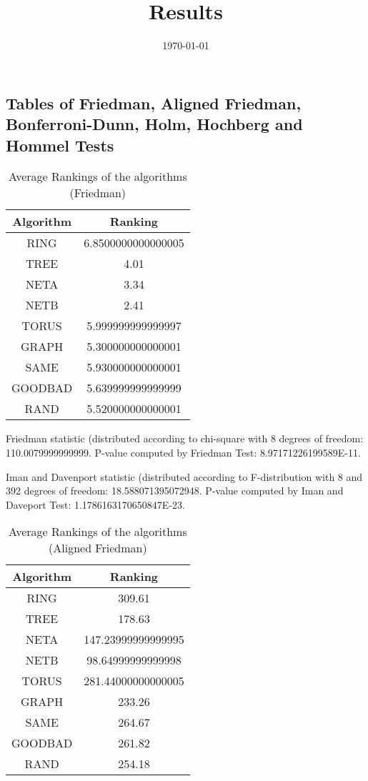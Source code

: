 \documentclass[a4paper,10pt]{article}
\title{Results}
\author{}
\date{\today}
\begin{document}
\begin{landscape}
\oddsidemargin 0in \topmargin 0in\maketitle
\section{Tables of Friedman, Aligned Friedman, Bonferroni-Dunn, Holm, Hochberg and Hommel Tests}
\begin{table}[!htp]
\centering
\caption{Average Rankings of the algorithms (Friedman)
}\begin{tabular}{c|c}
Algorithm&Ranking\\
\hline
 RING&6.8500000000000005\\
 TREE&4.01\\
 NETA&3.34\\
 NETB&2.41\\
 TORUS&5.999999999999997\\
 GRAPH&5.300000000000001\\
 SAME&5.930000000000001\\
 GOODBAD&5.639999999999999\\
 RAND&5.520000000000001\\
\end{tabular}
\end{table}


Friedman statistic (distributed according to chi-square with 8 degrees of freedom: 110.0079999999999. 
P-value computed by Friedman Test: 8.97171226199589E-11.\newline

Iman and Davenport statistic (distributed according to F-distribution with 8 and 392 degrees of freedom: 18.588071395072948. 
P-value computed by Iman and Daveport Test: 1.1786163170650847E-23.\newline


\newpage

\begin{table}[!htp]
\centering
\caption{Average Rankings of the algorithms (Aligned Friedman)
}\begin{tabular}{c|c}
Algorithm&Ranking\\
\hline
 RING&309.61\\
 TREE&178.63\\
 NETA&147.23999999999995\\
 NETB&98.64999999999998\\
 TORUS&281.44000000000005\\
 GRAPH&233.26\\
 SAME&264.67\\
 GOODBAD&261.82\\
 RAND&254.18\\
\end{tabular}
\end{table}



\end{landscape}
\end{document}

